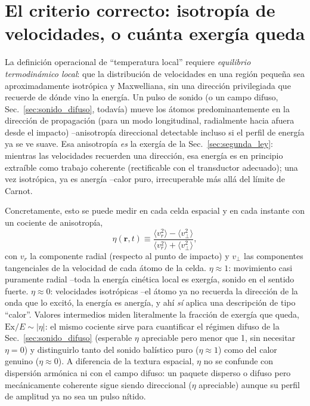 \documentclass[11pt,a4paper]{article}
\begin{document}
\section{El criterio correcto: isotropía de velocidades, o cuánta exergía queda}
\label{sec:criterio}

La definición operacional de ``temperatura local'' requiere \emph{equilibrio
termodinámico local}: que la distribución de velocidades en una región
pequeña sea aproximadamente isotrópica y Maxwelliana, sin una dirección
privilegiada que recuerde de dónde vino la energía. Un pulso de sonido (o
un campo difuso, Sec.~\ref{sec:sonido_difuso}, todavía) mueve los átomos
predominantemente en la dirección de propagación (para un modo
longitudinal, radialmente hacia afuera desde el impacto) --anisotropía
direccional detectable incluso si el perfil de energía ya se ve suave. Esa
anisotropía \emph{es} la exergía de la Sec.~\ref{sec:segunda_ley}: mientras
las velocidades recuerden una dirección, esa energía es en principio
extraíble como trabajo coherente (rectificable con el transductor
adecuado); una vez isotrópica, ya es anergía --calor puro, irrecuperable
más allá del límite de Carnot.

Concretamente, esto se puede medir en cada celda espacial y en cada
instante con un cociente de anisotropía,
\begin{equation}
\eta(\mathbf r,t) \equiv
\frac{\langle v_r^2\rangle - \langle v_\perp^2\rangle}
     {\langle v_r^2\rangle + \langle v_\perp^2\rangle},
\label{eq:anisotropia}
\end{equation}
con $v_r$ la componente radial (respecto al punto de impacto) y $v_\perp$
las componentes tangenciales de la velocidad de cada átomo de la celda.
$\eta\approx1$: movimiento casi puramente radial --toda la energía
cinética local es exergía, sonido en el sentido fuerte. $\eta\approx0$:
velocidades isotrópicas --el átomo ya no recuerda la dirección de la onda
que lo excitó, la energía es anergía, y ahí \emph{sí} aplica una
descripción de tipo ``calor''. Valores intermedios miden literalmente la
fracción de exergía que queda, $\mathrm{Ex}/E\sim|\eta|$: el mismo cociente
sirve para cuantificar el régimen difuso de la Sec.~\ref{sec:sonido_difuso}
(esperable $\eta$ apreciable pero menor que 1, sin necesitar $\eta=0$) y
distinguirlo tanto del sonido balístico puro ($\eta\approx1$) como del
calor genuino ($\eta\approx0$). A diferencia de la textura espacial,
$\eta$ no se confunde con dispersión armónica ni con el campo difuso: un
paquete disperso o difuso pero mecánicamente coherente sigue siendo
direccional ($\eta$ apreciable) aunque su perfil de amplitud ya no sea un
pulso nítido.
\end{document}
